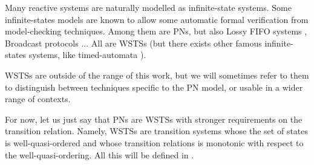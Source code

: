 
Many reactive systems are naturally modelled as infinite-state systems.
Some infinite-states models are known to allow some automatic formal verification from model-checking techniques.
Among them are \acp{PN}, but also Lossy FIFO systems \citep{Abdulla98}, Broadcast protocols \citep{Emerson98}...
All are \acp{WSTS} (but there exists other famous infinite-states systems, like timed-automata \citep{Alur94}).

\acp{WSTS} are outside of the range of this work, but we will sometimes refer to them to distinguish between techniques specific to the \ac{PN} model, or usable in a wider range of contexts.

For now, let us just say that \acp{PN} are \acp{WSTS} with stronger requirements on the transition relation.
Namely, \acp{WSTS} are transition systems whose the set of states is well-quasi-ordered and whose transition relations is monotonic with respect to the well-quasi-ordering.
All this will be defined in .

